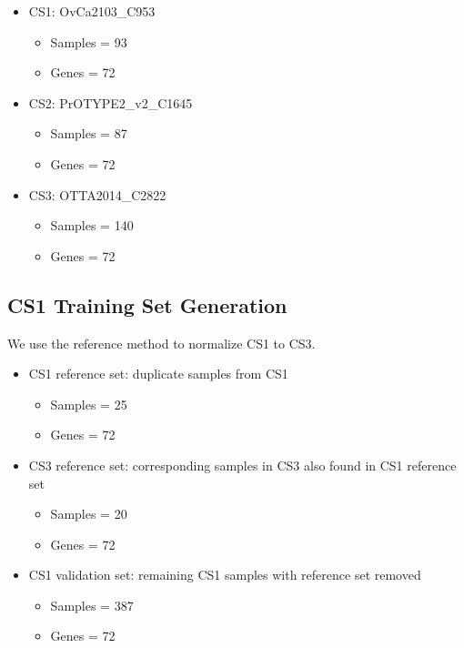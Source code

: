 \documentclass[
]{report}
\providecommand{\tightlist}{%
  \setlength{\itemsep}{0pt}\setlength{\parskip}{0pt}}
\begin{document}
\begin{itemize}
\tightlist
\item
  CS1: OvCa2103\_C953

  \begin{itemize}
  \tightlist
  \item
    Samples = 93
  \item
    Genes = 72
  \end{itemize}
\item
  CS2: PrOTYPE2\_v2\_C1645

  \begin{itemize}
  \tightlist
  \item
    Samples = 87
  \item
    Genes = 72
  \end{itemize}
\item
  CS3: OTTA2014\_C2822

  \begin{itemize}
  \tightlist
  \item
    Samples = 140
  \item
    Genes = 72
  \end{itemize}
\end{itemize}

\hypertarget{cs1-training-set-generation}{%
\subsection{CS1 Training Set Generation}\label{cs1-training-set-generation}}

We use the reference method to normalize CS1 to CS3.

\begin{itemize}
\tightlist
\item
  CS1 reference set: duplicate samples from CS1

  \begin{itemize}
  \tightlist
  \item
    Samples = 25
  \item
    Genes = 72
  \end{itemize}
\item
  CS3 reference set: corresponding samples in CS3 also found in CS1 reference set

  \begin{itemize}
  \tightlist
  \item
    Samples = 20
  \item
    Genes = 72
  \end{itemize}
\item
  CS1 validation set: remaining CS1 samples with reference set removed

  \begin{itemize}
  \tightlist
  \item
    Samples = 387
  \item
    Genes = 72
  \end{itemize}
\end{itemize}
\end{document}
